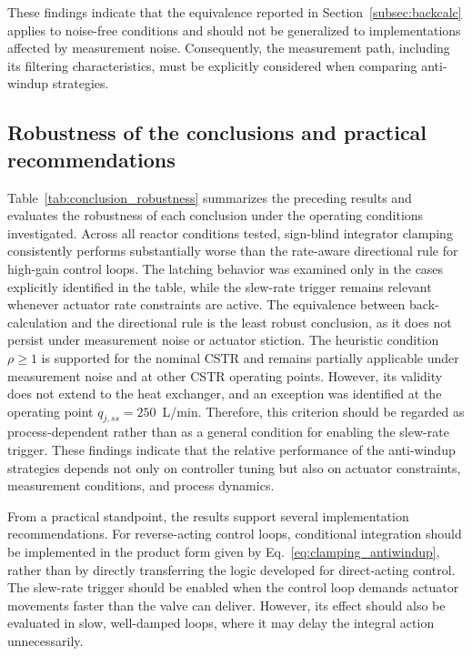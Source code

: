 These findings indicate that the equivalence reported in Section~\ref{subsec:backcalc} applies to noise-free conditions and should not be generalized to implementations affected by measurement noise. Consequently, the measurement path, including its filtering characteristics, must be explicitly considered when comparing anti-windup strategies.

\subsection{Robustness of the conclusions and practical recommendations}
\label{subsec:robustness_summary}
Table~\ref{tab:conclusion_robustness} summarizes the preceding results and evaluates the robustness of each conclusion under the operating conditions investigated. Across all reactor conditions tested, sign-blind integrator clamping consistently performs substantially worse than the rate-aware directional rule for high-gain control loops. The latching behavior was examined only in the cases explicitly identified in the table, while the slew-rate trigger remains relevant whenever actuator rate constraints are active. The equivalence between back-calculation and the directional rule is the least robust conclusion, as it does not persist under measurement noise or actuator stiction. The heuristic condition $\rho \ge 1$ is supported for the nominal CSTR and remains partially applicable under measurement noise and at other CSTR operating points. However, its validity does not extend to the heat exchanger, and an exception was identified at the operating point $q_{j,ss} = 250$~L/min. Therefore, this criterion should be regarded as process-dependent rather than as a general condition for enabling the slew-rate trigger. These findings indicate that the relative performance of the anti-windup strategies depends not only on controller tuning but also on actuator constraints, measurement conditions, and process dynamics.

From a practical standpoint, the results support several implementation recommendations. For reverse-acting control loops, conditional integration should be implemented in the product form given by Eq.~\eqref{eq:clamping_antiwindup}, rather than by directly transferring the logic developed for direct-acting control. The slew-rate trigger should be enabled when the control loop demands actuator movements faster than the valve can deliver. However, its effect should also be evaluated in slow, well-damped loops, where it may delay the integral action unnecessarily.

